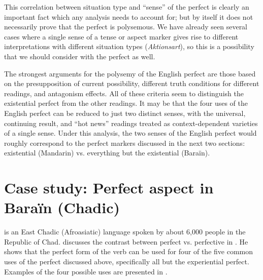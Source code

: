 This correlation between situation type and “sense” of the perfect is clearly an important fact which any analysis needs to account for; but by itself it does not necessarily prove that the perfect is polysemous. We have already seen several cases where a single sense of a tense or aspect marker gives rise to different interpretations with different situation types (\textit{Aktionsart}), so this is a possibility that we should consider with the perfect as well.


The strongest arguments for the polysemy of the English perfect are those based on the presupposition of current possibility, different truth conditions for different readings, and antagonism effects. All of these criteria seem to distinguish the existential perfect from the other readings. It may be that the four uses of the English perfect can be reduced to just two distinct senses, with the universal, continuing result, and “hot news” readings treated as context-dependent varieties of a single sense. Under this analysis, the two senses of the English perfect would roughly correspond to the perfect markers discussed in the next two sections: existential (Mandarin) vs. everything but the existential (Baraïn).


\section{Case study: Perfect aspect in Baraïn (Chadic)}\label{sec:22.5}

 is an East Chadic (Afroasiatic) language spoken by about 6,000 people in the Republic of Chad. \citet{Lovestrand2012} discusses the contrast between perfect vs. perfective in . He shows that the perfect form of the verb can be used for four of the five common uses of the perfect discussed above, specifically all but the experiential perfect. Examples of the four possible uses are presented in .


